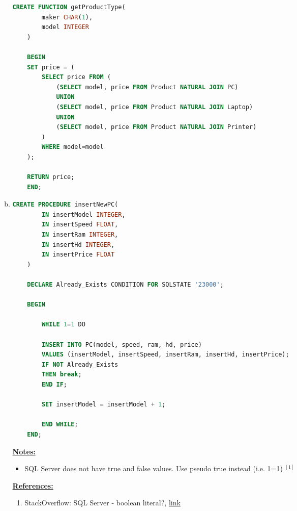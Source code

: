 \documentclass[12pt]{article}
\begin{document}
\begin{enumerate}[1.]
\begin{enumerate}[a)]
    \begin{lstlisting}[language=SQL]
    CREATE FUNCTION getProductType(
        maker CHAR(1),
        model INTEGER
    )

    BEGIN
    SET price = (
        SELECT price FROM (
            (SELECT model, price FROM Product NATURAL JOIN PC)
            UNION
            (SELECT model, price FROM Product NATURAL JOIN Laptop)
            UNION
            (SELECT model, price FROM Product NATURAL JOIN Printer)
        )
        WHERE model=model
    );

    RETURN price;
    END;

    \end{lstlisting}

        \item

    \begin{lstlisting}[language=SQL]
    CREATE PROCEDURE insertNewPC(
        IN insertModel INTEGER,
        IN insertSpeed FLOAT,
        IN insertRam INTEGER,
        IN insertHd INTEGER,
        IN insertPrice FLOAT
    )

    DECLARE Already_Exists CONDITION FOR SQLSTATE '23000';

    BEGIN

        WHILE 1=1 DO

        INSERT INTO PC(model, speed, ram, hd, price)
        VALUES (insertModel, insertSpeed, insertRam, insertHd, insertPrice);
        IF NOT Already_Exists
        THEN break;
        END IF;

        SET insertModel = insertModel + 1;

        END WHILE;
    END;

    \end{lstlisting}

        \bigskip

        \underline{\textbf{Notes:}}

        \bigskip

        \begin{itemize}
            \item SQL Server does not have true and false values. Use pseudo true instead (i.e. 1=1) $^{[1]}$
        \end{itemize}

        \bigskip

        \underline{\textbf{References:}}

        \bigskip

        \begin{enumerate}[1)]
            \item StackOverflow: SQL Server - boolean literal?, \href{https://stackoverflow.com/questions/7170688/sql-server-boolean-literal}{link}
        \end{enumerate}


\end{enumerate}
\end{enumerate}
\end{document}
